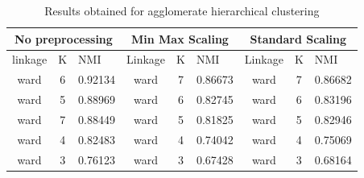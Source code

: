 \documentclass[12pt]{article}
\begin{document}
\begin{table}[H]
\centering
\begin{tabular}{|cc|l|cc|l|cc|l|}
\hline
\multicolumn{3}{|c|}{No preprocessing}                          & \multicolumn{3}{c|}{Min Max Scaling}                           & \multicolumn{3}{c|}{Standard Scaling}                          \\ \hline
\multicolumn{1}{|l}{linkage} & \multicolumn{1}{l|}{K} & NMI     & \multicolumn{1}{l}{Linkage} & \multicolumn{1}{l|}{K} & NMI     & \multicolumn{1}{l}{Linkage} & \multicolumn{1}{l|}{K} & NMI     \\ \hline
ward                         & 6                      & 0.92134 & ward                        & 7                      & 0.86673 & ward                        & 7                      & 0.86682 \\
ward                         & 5                      & 0.88969 & ward                        & 6                      & 0.82745 & ward                        & 6                      & 0.83196 \\
ward                         & 7                      & 0.88449 & ward                        & 5                      & 0.81825 & ward                        & 5                      & 0.82946 \\
ward                         & 4                      & 0.82483 & ward                        & 4                      & 0.74042 & ward                        & 4                      & 0.75069 \\
ward                         & 3                      & 0.76123 & ward                        & 3                      & 0.67428 & ward                        & 3                      & 0.68164 \\ \hline
\end{tabular}
\caption{Results obtained for agglomerate hierarchical clustering}
\label{res:hier}
\end{table}
\end{document}
